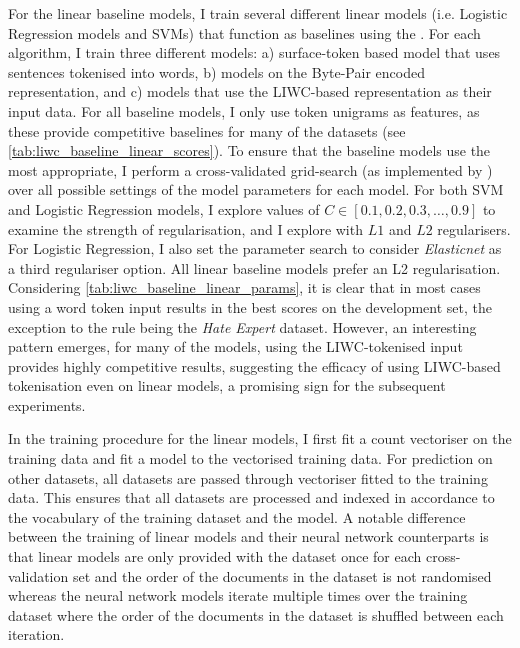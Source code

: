 For the linear baseline models, I train several different linear models (i.e. Logistic Regression models and SVMs) that function as baselines using the \citet{Pedregosa:2015}. 
For each algorithm, I train three different models: a) surface-token based model that uses sentences tokenised into words, b) models on the Byte-Pair encoded representation, and c) models that use the LIWC-based representation as their input data. 
For all baseline models, I only use token unigrams as features, as these provide competitive baselines for many of the datasets (see \autoref{tab:liwc_baseline_linear_scores}). 
To ensure that the baseline models use the most appropriate, I perform a cross-validated grid-search (as implemented by \citet{Pedregosa:2015}) over all possible settings of the model parameters for each model.
For both SVM and Logistic Regression models, I explore values of $C\in [0.1, 0.2, 0.3, \ldots, 0.9]$ to examine the strength of regularisation, and I explore with $L1$ and $L2$ regularisers. 
For Logistic Regression, I also set the parameter search to consider \textit{Elasticnet} as a third regulariser option.
All linear baseline models prefer an L2 regularisation. Considering \cref{tab:liwc_baseline_linear_params}, it is clear that in most cases using a word token input results in the best scores on the development set, the exception to the rule being the \textit{Hate Expert} dataset. However, an interesting pattern emerges, for many of the models, using the LIWC-tokenised input provides highly competitive results, suggesting the efficacy of using LIWC-based tokenisation even on linear models, a promising sign for the subsequent experiments.

In the training procedure for the linear models, I first fit a count vectoriser on the training data and fit a model to the vectorised training data. For prediction on other datasets, all datasets are passed through vectoriser fitted to the training data. This ensures that all datasets are processed and indexed in accordance to the vocabulary of the training dataset and the model. A notable difference between the training of linear models and their neural network counterparts is that linear models are only provided with the dataset once for each cross-validation set and the order of the documents in the dataset is not randomised whereas the neural network models iterate multiple times over the training dataset where the order of the documents in the dataset is shuffled between each iteration.

